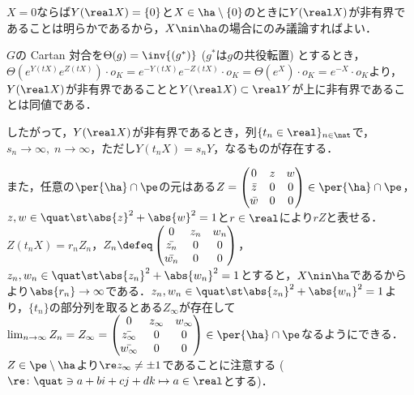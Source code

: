 \begin{npfwn}
  
  $X = 0$ならば$ Y(\real X) = \{0\} $と$X\in \ha\setminus\{0\} $のときに$Y(\real X) $が非有界であることは明らかであるから，$X\nin \ha $の場合にのみ議論すればよい．%

  $G$の Cartan 対合を$\Theta(g) = \inv{(g^{*})} $ ($g^{*}$は$g$の共役転置) とするとき，$\Theta(e^{Y(tX)}e^{Z(tX)})\cdot o_K = e^{-Y(tX)}e^{-Z(tX)}\cdot o_K = \Theta(e^{X})\cdot o_K = e^{-X}\cdot o_K $より，$Y(\real X) $が非有界であることと$ Y(\real X)\subset \real Y $が上に非有界であることは同値である．

  したがって，$Y (\real X) $が非有界であるとき，列$\{t_n \in \real \}_{n\in \nat} $で，$s_n\to \infty,\; n\to \infty$，ただし$Y(t_n X) = s_n Y$，なるものが存在する．

  また，任意の$\per{\ha}\cap\pe $の元はある$Z =
  \begin{pmatrix}
    0 & z & w \\
    \bar{z} & 0 & 0 \\
    \bar{w} & 0 & 0 
  \end{pmatrix} \in \per{\ha}\cap\pe $，$z,w\in \quat \st \abs{z}^2 +\abs{w}^2  = 1 $と$r\in \real$により$rZ$と表せる．$Z(t_nX) = r_nZ_n$，$Z_n\defeq \begin{pmatrix}
    0 & z_n & w_n \\
    \bar{z_n} & 0 & 0 \\
    \bar{w_n} & 0 & 0 
  \end{pmatrix} $，$z_n,w_n\in \quat \st \abs{z_n}^2 +\abs{w_n}^2  = 1 $とすると，$X\nin\ha$であるからより$\abs{r_n}\to \infty $である．$z_n,w_n\in \quat \st \abs{z_n}^2 +\abs{w_n}^2  = 1 $より，$\{t_n\} $の部分列を取るとある$Z_{\infty} $が存在して$\lim_{n\to \infty}Z_n = Z_{\infty} =
  \begin{pmatrix}
    0 & z_{\infty} & w_{\infty} \\
    \bar{z_{\infty}} & 0 & 0 \\
    \bar{w_{\infty}} & 0 & 0 
  \end{pmatrix}
  \in \per{\ha}\cap\pe $なるようにできる．$Z\in\pe\setminus \ha $より$\re z_{\infty} \neq \pm 1$であることに注意する ($\re\colon \quat\ni a+bi+cj+dk\mapsto a\in \real$とする)．


\end{npfwn}
